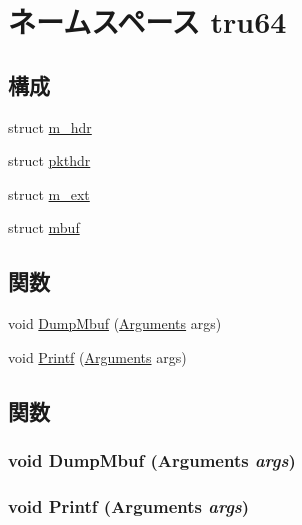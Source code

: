 \hypertarget{namespacetru64}{
\section{ネームスペース tru64}
\label{namespacetru64}
}
\subsection*{構成}
\begin{DoxyCompactItemize}
\item 
struct \hyperlink{structtru64_1_1m__hdr}{m\_\-hdr}
\item 
struct \hyperlink{structtru64_1_1pkthdr}{pkthdr}
\item 
struct \hyperlink{structtru64_1_1m__ext}{m\_\-ext}
\item 
struct \hyperlink{structtru64_1_1mbuf}{mbuf}
\end{DoxyCompactItemize}
\subsection*{関数}
\begin{DoxyCompactItemize}
\item 
void \hyperlink{namespacetru64_ac9ff980e04e67585b5b3669ab36ad109}{DumpMbuf} (\hyperlink{classArguments}{Arguments} args)
\item 
void \hyperlink{namespacetru64_af8b8f48becb5e47991a7e1793e7f08da}{Printf} (\hyperlink{classArguments}{Arguments} args)
\end{DoxyCompactItemize}


\subsection{関数}
\hypertarget{namespacetru64_ac9ff980e04e67585b5b3669ab36ad109}{
\subsubsection[{DumpMbuf}]{\setlength{\rightskip}{0pt plus 5cm}void DumpMbuf ({\bf Arguments} {\em args})}}
\label{namespacetru64_ac9ff980e04e67585b5b3669ab36ad109}
\hypertarget{namespacetru64_af8b8f48becb5e47991a7e1793e7f08da}{
\subsubsection[{Printf}]{\setlength{\rightskip}{0pt plus 5cm}void Printf ({\bf Arguments} {\em args})}}
\label{namespacetru64_af8b8f48becb5e47991a7e1793e7f08da}
